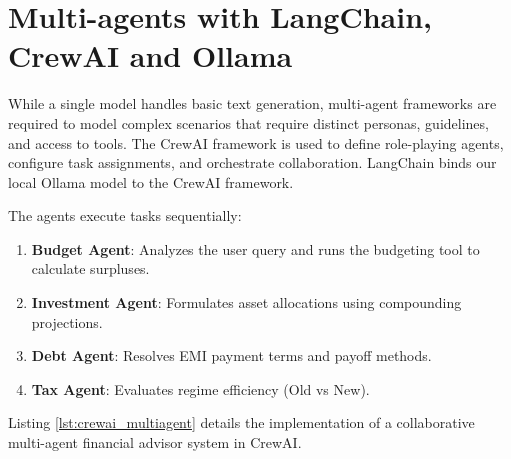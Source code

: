 \section{Multi-agents with LangChain, CrewAI and Ollama}
While a single model handles basic text generation, multi-agent frameworks are required to model complex scenarios that require distinct personas, guidelines, and access to tools. The CrewAI framework is used to define role-playing agents, configure task assignments, and orchestrate collaboration. LangChain binds our local Ollama model to the CrewAI framework.

The agents execute tasks sequentially:
\begin{enumerate}
    \item \textbf{Budget Agent}: Analyzes the user query and runs the budgeting tool to calculate surpluses.
    \item \textbf{Investment Agent}: Formulates asset allocations using compounding projections.
    \item \textbf{Debt Agent}: Resolves EMI payment terms and payoff methods.
    \item \textbf{Tax Agent}: Evaluates regime efficiency (Old vs New).
\end{enumerate}

Listing \ref{lst:crewai_multiagent} details the implementation of a collaborative multi-agent financial advisor system in CrewAI.

